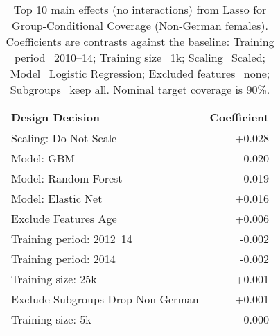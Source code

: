 \begin{table}
\centering
\caption{Top 10 main effects (no interactions) from Lasso for Group-Conditional Coverage (Non-German females). Coefficients are contrasts against the baseline: Training period=2010–14; Training size=1k; Scaling=Scaled; Model=Logistic Regression; Excluded features=none; Subgroups=keep all. Nominal target coverage is 90\%.}
\label{tab:main_effects_gcc_ng_female}
\begin{tabular}{l r}
\toprule
                  Design Decision & Coefficient \\
\midrule
            Scaling: Do-Not-Scale &      +0.028 \\
                       Model: GBM &      -0.020 \\
             Model: Random Forest &      -0.019 \\
               Model: Elastic Net &      +0.016 \\
             Exclude Features Age &      +0.006 \\
         Training period: 2012–14 &      -0.002 \\
            Training period: 2014 &      -0.002 \\
               Training size: 25k &      +0.001 \\
Exclude Subgroups Drop-Non-German &      +0.001 \\
                Training size: 5k &      -0.000 \\
\bottomrule
\end{tabular}
\end{table}
